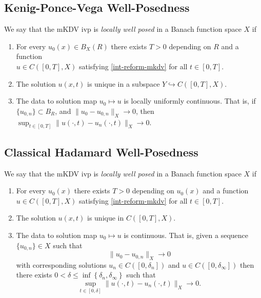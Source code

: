 \documentclass[12pt,reqno]{amsart}
\numberwithin{equation}{section}  %
\begin{document}
        \subsection{Kenig-Ponce-Vega Well-Posedness} 
        \label{ssec:kpv-wp}
	We say that the mKDV ivp is
	\emph{locally well posed} in a Banach function space
	$X$ if 
	\begin{enumerate}
		\item For every $u_{0}(x) \in
      B_{X}(R)$ there exists $T>0$ depending on $R$ and a function
	\\
	$u \in C([0, T],
  X)$ satisfying \eqref{int-reform-mkdv} for all $t \in [0, T]$.
\item The solution $u(x,t)$ is unique in a subspace $Y \hookrightarrow
  C([0, T], X)$.  
\item The data to solution map $u_0 \mapsto u$ is locally uniformly continuous. That is,
  if$\{u_{0,n}\} \subset B_R$, and 
  $\|u_0 - u_{0, n} \|_{X} \to 0$, then $\sup_{t \in [0,T]} \|u(\cdot, t) - u_{n}(\cdot,t) \|_{X} \to
	0$.
	\end{enumerate}
  \subsection{Classical Hadamard Well-Posedness} 
  \label{ssec:hadamard-wp}
   We say that the mKDV ivp
   is
	\emph{locally well posed} in a Banach function space $X$ if
	\begin{enumerate}
    \item For every $u_{0}(x)$ there exists $T>0$ depending on $u_{0}(x)$
      and a function $u \in C([0, T],
  X)$ satisfying \eqref{int-reform-mkdv} for all $t \in [0, T]$.
\item The solution $u(x,t)$ is unique in $C([0,T], X)$.  
    \item
      The data to solution map $u_0 \mapsto u$ is continuous. That
      is, given a sequence $\{u_{0,n} \} \in X$
      such that $$\|u_{0} - u_{0,n} \|_{X} \to 0$$
      with corresponding solutions $u_{n} \in
      C([0,
      \delta_{n}])$ and $u \in C([0, \delta_{\infty}])$
      then there exists $0 < \delta \le \inf\left\{
      \delta_{n}, \delta_{\infty} \right\}$ such that 
      $$\sup_{t \in [0, \delta]} \|u(\cdot, t) - u_{n}(\cdot, t) \|_{X} \to 0 
      .$$
  \end{enumerate}
\end{document}
